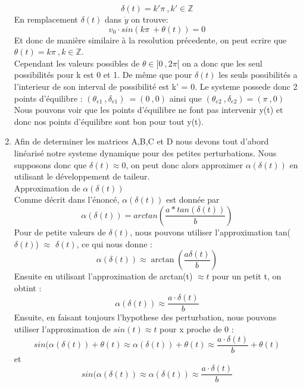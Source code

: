 \documentclass[a4paper, 11pt]{article}
\begin{document}
\begin{enumerate}
    \[\delta(t) = k'\pi \ , k' \in \mathbb{Z}\]
    En remplacement \(\delta(t)\) dans \(\dot{y}\) on trouve:
    \[v_0 \cdot sin( k\pi \ + \theta(t)) = 0\] 
    Et donc de manière similaire à la resolution précedente, on peut ecrire que \(\theta(t) = k\pi \ , k \in \mathbb{Z}\).\\
    Cependant les valeurs possibles de $\theta \in [0 \ , 2\pi[$ on a donc que les seul possibilités pour k est 0 et 1. De même que pour $\delta(t)$ les seuls possibilités a l'interieur de son interval de possibilité est k' = 0. Le systeme possede donc 2 points d'équilibre : $(\theta_{e1} \ , \delta_{e1}) \ = (0 \ , 0)$ ainsi que $(\theta_{e2} \ , \delta_{e2}) = (\pi \ , 0 ) $ Nous pouvons voir que les points d'équilibre ne font pas intervenir y(t) et donc nos points d'équilibre sont bon pour tout y(t).\\ 
    

    
    \item Afin de determiner les matrices A,B,C et D nous devons tout d'abord linéarisé notre systeme dynamique pour des petites perturbations. Nous supposons donc que \(\delta(t) \approx 0\), on peut donc alors approximer \(\alpha(\delta(t))\) en utilisant le développement de taileur.\\
    Approximation de \(\alpha(\delta(t))\)\\
    Comme décrit dans l'énoncé, \(\alpha(\delta(t))\) est donnée par 
    \[\alpha(\delta(t)) = arctan( \dfrac{a*tan(\delta(t) )}{b})\]
    Pour de petite valeurs de \(\delta(t)\), nous pouvons utiliser l'approximation tan(\(\delta(t)\)) \(\approx\) \(\delta(t)\), ce qui nous donne :   
    \[
    \alpha(\delta(t)) \approx \arctan\left(\frac{a\delta(t)}{b}\right)
    \]
    Ensuite en utilisant l'approximation de arctan(t) \(\approx t \) pour un petit t, on obtint : 
    \[
\alpha(\delta(t)) \approx \dfrac{a \cdot \delta(t)}{b}
\]
    Ensuite, en faisant toujours l'hypothese des perturbation, nous pouvons utiliser l'approximation de \(sin(t) \approx t\) pour x proche de 0 : 
    \[sin(\alpha(\delta(t)) + \theta(t) \approx \alpha(\delta(t)) + \theta(t) \approx \dfrac{a \cdot\delta(t)}{b} + \theta(t) \]
    et 
    \[sin(\alpha(\delta(t)) \approx \alpha(\delta(t)) \approx \dfrac{a\cdot\delta(t)}{b} \]


\end{enumerate}
\end{document}
